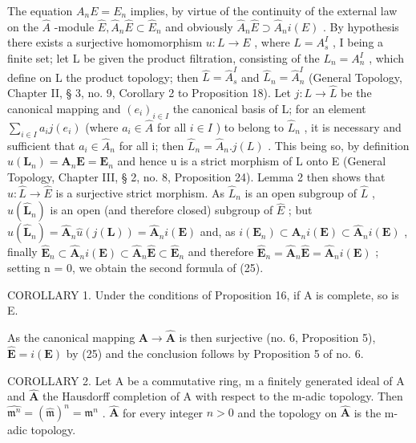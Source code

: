 The equation \(A_{n}E = E_{n}\) implies, by virtue of the continuity of the external law on the \(\hat{A}\) -module \(\hat{E}, \hat{A}_{n}\hat{E} \subset \hat{E}_{n}\) and obviously \(\hat{A}_{n}\hat{E} \supset \hat{A}_{n}i(E)\) . By hypothesis there exists a surjective homomorphism \(u: L \to E\) , where \(L = A_{s}^{I}\) , I being a finite set; let L be given the product filtration, consisting of the \(L_{n} = A_{n}^{I}\) , which define on L the product topology; then \(\hat{L} = \hat{A}_{s}^{I}\) and \(\hat{L}_{n} = \hat{A}_{n}^{I}\) (General Topology, Chapter II, § 3, no. 9, Corollary 2 to Proposition 18). Let \(j: L \to \hat{L}\) be the canonical mapping and \((e_{i})_{i \in I}\) the canonical basis of L; for an element \(\sum_{i \in I} a_{i}j(e_{i})\) (where \(a_{i} \in \hat{A}\) for all \(i \in I\) ) to belong to \(\hat{L}_{n}\) , it is necessary and sufficient that \(a_{i} \in \hat{A}_{n}\) for all i; then \(\hat{L}_{n} = \hat{A}_{n}.j(L)\) . This being so, by definition \(u(\mathbf{L}_{n}) = \mathbf{A}_{n}\mathbf{E} = \mathbf{E}_{n}\) and hence u is a strict morphism of L onto E (General Topology, Chapter III, § 2, no. 8, Proposition 24). Lemma 2 then shows that \(\hat{u}: \hat{L} \to \hat{E}\) is a surjective strict morphism. As \(\hat{L}_{n}\) is an open subgroup of \(\hat{L}\) , \(\hat{u}(\hat{\mathbf{L}}_{n})\) is an open (and therefore closed) subgroup of \(\hat{E}\) ; but \(\hat{u}(\hat{\mathbf{L}}_{n}) = \hat{\mathbf{A}}_{n}\hat{u}(j(\mathbf{L})) = \hat{\mathbf{A}}_{n}i(\mathbf{E})\) and, as \(i(\mathbf{E}_{n}) \subset \mathbf{A}_{n}i(\mathbf{E}) \subset \hat{\mathbf{A}}_{n}i(\mathbf{E})\) , finally \(\hat{\mathbf{E}}_{n} \subset \hat{\mathbf{A}}_{n}i(\mathbf{E}) \subset \hat{\mathbf{A}}_{n}\hat{\mathbf{E}} \subset \hat{\mathbf{E}}_{n}\) and therefore \(\hat{\mathbf{E}}_{n} = \hat{\mathbf{A}}_{n}\hat{\mathbf{E}} = \hat{\mathbf{A}}_{n}i(\mathbf{E})\) ; setting n = 0, we obtain the second formula of (25).

COROLLARY 1. Under the conditions of Proposition 16, if A is complete, so is E.

As the canonical mapping \(\mathbf{A} \to \hat{\mathbf{A}}\) is then surjective (no. 6, Proposition 5), \(\hat{\mathbf{E}} = i(\mathbf{E})\) by (25) and the conclusion follows by Proposition 5 of no. 6.

COROLLARY 2. Let A be a commutative ring, m a finitely generated ideal of A and \(\hat{\mathbf{A}}\) the Hausdorff completion of A with respect to the m-adic topology. Then \(\widehat{\mathfrak{m}^n} = (\hat{\mathfrak{m}})^n = \mathfrak{m}^n\) . \(\hat{\mathbf{A}}\) for every integer \(n > 0\) and the topology on \(\hat{\mathbf{A}}\) is the m-adic topology.

